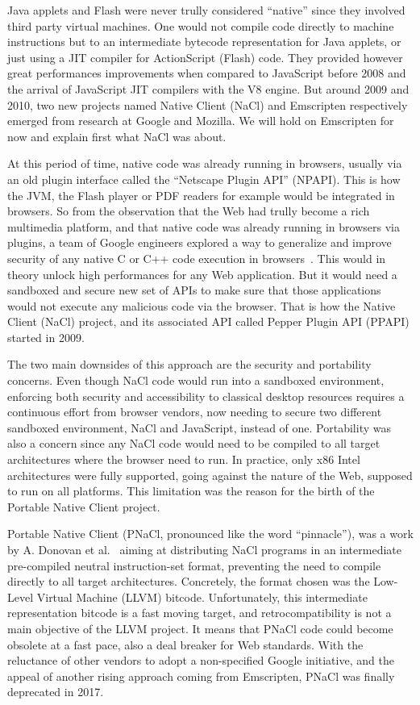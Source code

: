 Java applets and Flash were never trully considered ``native''
since they involved third party virtual machines.
One would not compile code directly to machine instructions
but to an intermediate bytecode representation for Java applets,
or just using a JIT compiler for ActionScript (Flash) code.
They provided however great performances improvements when compared
to JavaScript before 2008 and the arrival of JavaScript JIT compilers with the V8 engine.
But around 2009 and 2010, two new projects named Native Client (NaCl) and Emscripten
respectively emerged from research at Google and Mozilla.
We will hold on Emscripten for now and explain first what NaCl was about.

At this period of time, native code was already running in browsers,
usually via an old plugin interface called the ``Netscape Plugin API'' (NPAPI).
This is how the JVM, the Flash player or PDF readers for example
would be integrated in browsers.
So from the observation that the Web had trully become a rich multimedia platform,
and that native code was already running in browsers via plugins,
a team of Google engineers explored a way to generalize and improve security
of any native C or C++ code execution in browsers~\cite{yee2009native}.
This would in theory unlock high performances for any Web application.
But it would need a sandboxed and secure new set of APIs
to make sure that those applications would not execute any malicious code via the browser.
That is how the Native Client (NaCl) project,
and its associated API called Pepper Plugin API (PPAPI) started in 2009.

The two main downsides of this approach are the security and portability concerns.
Even though NaCl code would run into a sandboxed environment,
enforcing both security and accessibility to classical desktop resources
requires a continuous effort from browser vendors,
now needing to secure two different sandboxed environment,
NaCl and JavaScript, instead of one.
Portability was also a concern since any NaCl code would need to be compiled
to all target architectures where the browser need to run.
In practice, only x86 Intel architectures were fully supported,
going against the nature of the Web, supposed to run on all platforms.
This limitation was the reason for the birth of the Portable Native Client project.

Portable Native Client (PNaCl, pronounced like the word ``pinnacle''),
was a work by A. Donovan et al.~\cite{donovan2010pnacl} aiming at distributing
NaCl programs in an intermediate pre-compiled neutral instruction-set format,
preventing the need to compile directly to all target architectures.
Concretely, the format chosen was the Low-Level Virtual Machine (LLVM) bitcode.
Unfortunately, this intermediate representation bitcode is a fast moving target,
and retrocompatibility is not a main objective of the LLVM project.
It means that PNaCl code could become obsolete at a fast pace,
also a deal breaker for Web standards.
With the reluctance of other vendors to adopt a non-specified Google initiative,
and the appeal of another rising approach coming from Emscripten,
PNaCl was finally deprecated in 2017.

